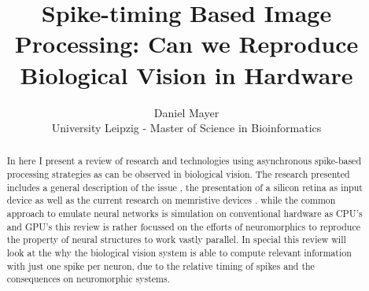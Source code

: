\documentclass{SeminarV2}
\begin{document}
\title{Spike-timing Based Image Processing: Can we Reproduce Biological Vision in Hardware}

\author{Daniel Mayer 
%
\vspace{.3cm}\\
%
University Leipzig - Master of Science in Bioinformatics}
%

\maketitle

\begin{abstract}
In here I present a review of research and technologies using asynchronous spike-based processing strategies as can be observed in biological vision.
The research presented includes a general description of the issue \cite{thorpe_spike-based_2012}, the presentation of a 
silicon retina \cite{lichtsteiner_128_2008} as input device as well as the current research on memristive devices \cite{jo_high-density_2009}.
while the common approach to emulate neural networks is simulation on conventional hardware as CPU's and GPU's this review is rather focussed on the efforts of neuromorphics to reproduce the property of neural structures to work vastly parallel. In special this review will look at the why the biological vision system is able to compute relevant information with just one spike per neuron, due to the relative timing of spikes and the consequences on neuromorphic systems.
\end{abstract}
\end{document}
